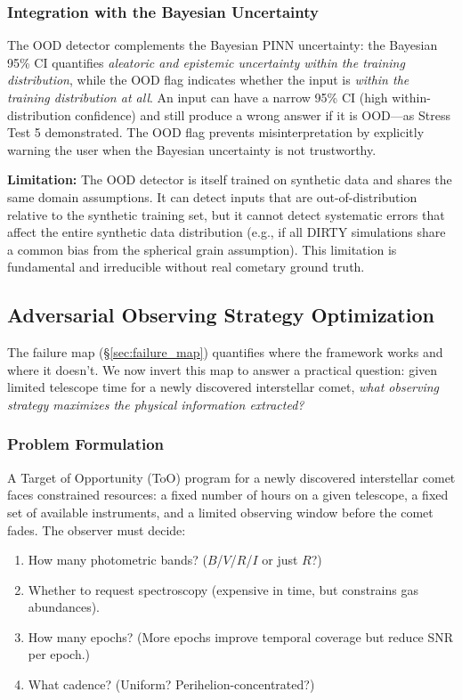 \documentclass[usenatbib]{mnras}
\begin{document}
\subsubsection{Integration with the Bayesian Uncertainty}

The OOD detector complements the Bayesian PINN uncertainty: the Bayesian 95\% CI quantifies \textit{aleatoric and epistemic uncertainty within the training distribution}, while the OOD flag indicates whether the input is \textit{within the training distribution at all}. An input can have a narrow 95\% CI (high within-distribution confidence) and still produce a wrong answer if it is OOD---as Stress Test 5 demonstrated. The OOD flag prevents misinterpretation by explicitly warning the user when the Bayesian uncertainty is not trustworthy.

\textbf{Limitation:} The OOD detector is itself trained on synthetic data and shares the same domain assumptions. It can detect inputs that are out-of-distribution relative to the synthetic training set, but it cannot detect systematic errors that affect the entire synthetic data distribution (e.g., if all DIRTY simulations share a common bias from the spherical grain assumption). This limitation is fundamental and irreducible without real cometary ground truth.

\subsection{Adversarial Observing Strategy Optimization}\label{sec:obsopt}

The failure map (\S\ref{sec:failure_map}) quantifies where the framework works and where it doesn't. We now invert this map to answer a practical question: given limited telescope time for a newly discovered interstellar comet, \textit{what observing strategy maximizes the physical information extracted?}

\subsubsection{Problem Formulation}

A Target of Opportunity (ToO) program for a newly discovered interstellar comet faces constrained resources: a fixed number of hours on a given telescope, a fixed set of available instruments, and a limited observing window before the comet fades. The observer must decide:
\begin{enumerate}
    \item How many photometric bands? ($B$/$V$/$R$/$I$ or just $R$?)
    \item Whether to request spectroscopy (expensive in time, but constrains gas abundances).
    \item How many epochs? (More epochs improve temporal coverage but reduce SNR per epoch.)
    \item What cadence? (Uniform? Perihelion-concentrated?)
\end{enumerate}
\end{document}
